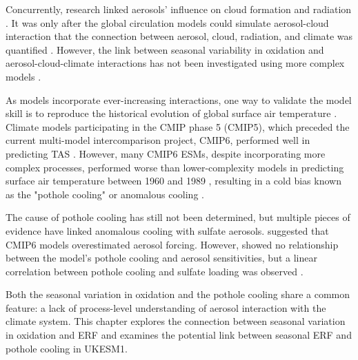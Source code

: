 Concurrently, research linked aerosols' influence on cloud formation and radiation \citep{angstromAtmosphericTransmissionSun1929,twomeyInfluencePollutionShortwave1977,albrechtAerosolsCloudMicrophysics1989}. It was only after the global circulation models could simulate aerosol-cloud interaction that the connection between aerosol, cloud, radiation, and climate was quantified \citep{charlsonPerturbationNorthernHemisphere1991, charlsonClimateForcingAnthropogenic1992,tsaiSulfurCycleSulfate2010}. However, the link between seasonal variability in oxidation and aerosol-cloud-climate interactions has not been investigated using more complex models \citep[e.g.,][]{charlsonPerturbationNorthernHemisphere1991,barrieComparisonLargescaleAtmospheric2001,isaksenAtmosphericCompositionChange2009,mulcahyDescriptionEvaluationAerosol2020,oconnorAssessmentPreindustrialPresentday2021}. 


As models incorporate ever-increasing interactions, one way to validate the model skill is to reproduce the historical evolution of global surface air temperature \citep[TAS;][]{fanGlobalSurfaceAir2020}. Climate models participating in the CMIP phase 5 (CMIP5), which preceded the current multi-model intercomparison project, CMIP6, performed well in predicting TAS \citep{flynnClimateSensitivityHistorical2020}. However, many CMIP6 ESMs, despite incorporating more complex processes, performed worse than lower-complexity models in predicting surface air temperature between 1960 and 1989 \citep{fanGlobalSurfaceAir2020}, resulting in a cold bias known as the "pothole cooling" or anomalous cooling \citep{zhangRoleAnthropogenicAerosols2021}. 

The cause of pothole cooling has still not been determined, but multiple pieces of evidence have linked anomalous cooling with sulfate aerosols. \citet{flynnClimateSensitivityHistorical2020} suggested that CMIP6 models overestimated aerosol forcing. However, \citet{zhangRoleAnthropogenicAerosols2021} showed no relationship between the model's pothole cooling and aerosol sensitivities, but a linear correlation between pothole cooling and sulfate loading was observed \citep{zhangRoleAnthropogenicAerosols2021}. 

Both the seasonal variation in oxidation and the pothole cooling share a common feature: a lack of process-level understanding of aerosol interaction with the climate system. This chapter explores the connection between seasonal variation in oxidation and ERF and examines the potential link between seasonal ERF and pothole cooling in UKESM1.


